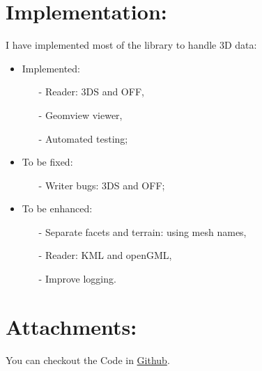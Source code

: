 \documentclass[a4paper, 11pt]{article}
\begin{document}
	\section*{Implementation:}
	I have implemented most of the library to handle 3D data:
	\begin{itemize}
		\item Implemented:
			\begin{itemize}
				\item[-] Reader: 3DS and OFF,
				\item[-] Geomview viewer,
				\item[-] Automated testing;
			\end{itemize}
		\item To be fixed:
			\begin{itemize}
				\item[-] Writer bugs: 3DS and OFF;
			\end{itemize}
		\item To be enhanced:
			\begin{itemize}
				\item[-] Separate facets and terrain: using mesh names,
				\item[-] Reader: KML and openGML,
				\item[-] Improve logging.
			\end{itemize}
	\end{itemize}
	
	\section*{Attachments:}
	
	You can checkout the Code in \href{https://github.com/Ethiy/3DSceneModel}{Github}.
	
	
	
\end{document}
